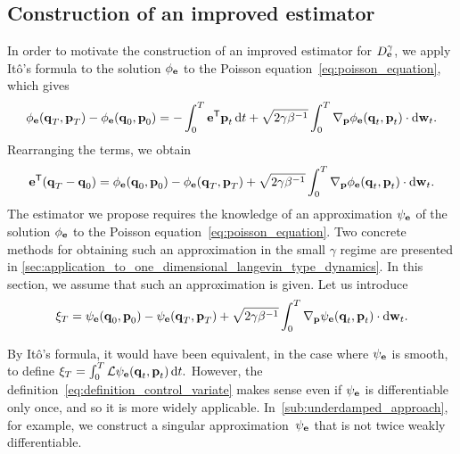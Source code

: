 \documentclass[11pt,a4paper]{article}
\begin{document}
\subsection{Construction of an improved estimator}%
\label{sub:construction_of_an_improved_estimator}
In order to motivate the construction of an improved estimator for $D^{\gamma}_{\boldsymbol{\mathbf e}}$,
we apply It\^o's formula to the solution $\phi_{\boldsymbol{\mathbf e}}$ to the Poisson equation~\eqref{eq:poisson_equation},
which gives
\[
    \phi_{\boldsymbol{\mathbf e}}(\boldsymbol{\mathbf q}_T, \boldsymbol{\mathbf p}_T) - \phi_{\boldsymbol{\mathbf e}}(\boldsymbol{\mathbf q}_0, \boldsymbol{\mathbf p}_0)
    = - \int_{0}^{T} \boldsymbol{\mathbf e}^\mathsf T \boldsymbol{\mathbf p}_t \, \mathrm d t + \sqrt{2 \gamma \beta^{-1}} \int_{0}^{T} \nabla_{\boldsymbol{\mathbf p}} \phi_{\boldsymbol{\mathbf e}}(\boldsymbol{\mathbf q}_t, \boldsymbol{\mathbf p}_t) \cdot \mathrm d \boldsymbol{\mathbf w}_t.
\]
Rearranging the terms,
we obtain
\begin{equation}
    \label{eq:ito_for_phi}
    \boldsymbol{\mathbf e}^\mathsf T(\boldsymbol{\mathbf q}_T - \boldsymbol{\mathbf q}_0) =
    \phi_{\boldsymbol{\mathbf e}}(\boldsymbol{\mathbf q}_0, \boldsymbol{\mathbf p}_0) - \phi_{\boldsymbol{\mathbf e}}(\boldsymbol{\mathbf q}_T, \boldsymbol{\mathbf p}_T)
    + \sqrt{2 \gamma \beta^{-1}} \int_{0}^{T} \nabla_{\boldsymbol{\mathbf p}} \phi_{\boldsymbol{\mathbf e}}(\boldsymbol{\mathbf q}_t, \boldsymbol{\mathbf p}_t) \cdot \mathrm d \boldsymbol{\mathbf w}_t.
\end{equation}
The estimator we propose requires the knowledge of an approximation $\psi_{\boldsymbol{\mathbf e}}$ of the solution $\phi_{\boldsymbol{\mathbf e}}$ to the Poisson equation~\eqref{eq:poisson_equation}.
Two concrete methods for obtaining such an approximation in the small $\gamma$ regime are presented in \cref{sec:application_to_one_dimensional_langevin_type_dynamics}.
In this section, we assume that such an approximation is given.
Let us introduce
\begin{align}
    \label{eq:definition_control_variate}
    \xi_T = \psi_{\boldsymbol{\mathbf e}}(\boldsymbol{\mathbf q}_0, \boldsymbol{\mathbf p}_0) - \psi_{\boldsymbol{\mathbf e}}(\boldsymbol{\mathbf q}_T, \boldsymbol{\mathbf p}_T)
    + \sqrt{2 \gamma \beta^{-1}} \int_{0}^{T} \nabla_{\boldsymbol{\mathbf p}} \psi_{\boldsymbol{\mathbf e}}(\boldsymbol{\mathbf q}_t, \boldsymbol{\mathbf p}_t) \cdot \mathrm d \boldsymbol{\mathbf w}_t.
\end{align}
\begin{remark}
    By It\^o's formula,
    it would have been equivalent, in the case where $\psi_{\boldsymbol{\mathbf e}}$ is smooth,
    to define
    \(
        \xi_T = \int_{0}^{T} \mathcal L \psi_{\boldsymbol{\mathbf e}}(\boldsymbol{\mathbf q}_t, \boldsymbol{\mathbf p}_t) \, \mathrm d t.
    \)
    However, the definition~\eqref{eq:definition_control_variate} makes sense even if $\psi_{\boldsymbol{\mathbf e}}$ is differentiable only once,
    and so it is more widely applicable.
    In~\cref{sub:underdamped_approach}, for example, we construct a singular approximation~$\psi_{\boldsymbol{\mathbf e}}$ that is not twice weakly differentiable.
\end{remark}
\end{document}
